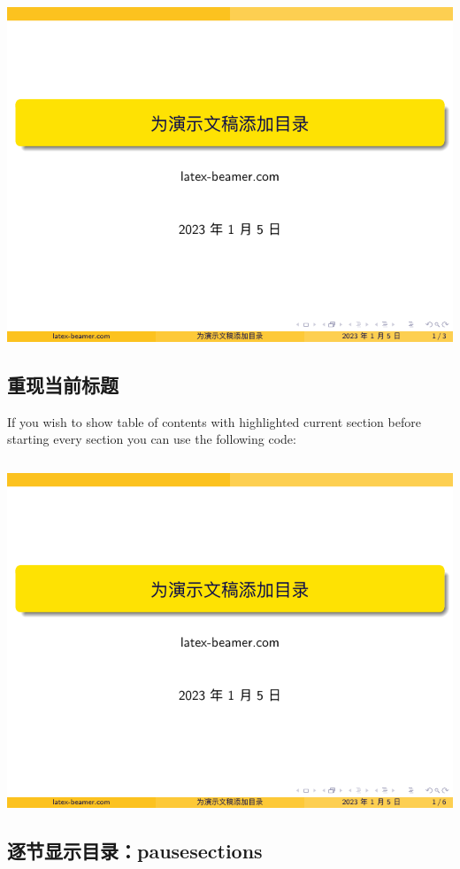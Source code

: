 \includegraphics[page=2]{examples/beamer/outline-hidesubsections.pdf}

\subsection{重现当前标题}

If you wish to show table of contents with highlighted current section before starting every section you can use the following code:

\inputminted[linenos=true]{latex}{examples/beamer/outline-recurring.tex}

\includegraphics[page=3]{examples/beamer/outline-recurring.pdf}

\subsection{逐节显示目录：{\ttfamily pausesections}}

